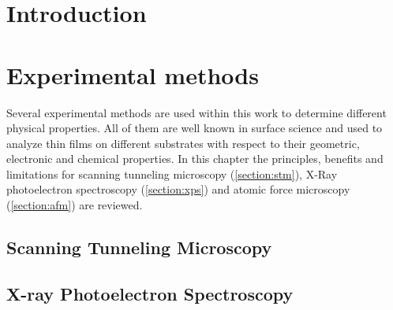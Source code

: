 \documentclass[
twoside,				%
BCOR=12mm,				%
headings=normal,		%
headsepline,			%
footsepline,			%
plainfootsepline,		%
]{scrbook}
\begin{document}

 \frontmatter{}			 														%
 \setcounter{tocdepth}{2}														%
	\tableofcontents{}														 	%
%
\mainmatter{}
\chapter{Introduction}


\chapter{Experimental methods}
Several experimental methods are used within this work to determine different physical properties. All of them are well known in surface science and used to analyze thin films on different substrates with respect to their geometric, electronic and chemical properties.
In this chapter the principles, benefits and limitations for scanning tunneling microscopy (\autoref{section:stm}), X-Ray photoelectron spectroscopy (\autoref{section:xps}) and atomic force microscopy (\autoref{section:afm}) are reviewed. 

  \section{\textbf{S}canning \textbf{T}unneling \textbf{M}icroscopy}
  \label{section:stm}
    
  \section{\textbf{X}-ray \textbf{P}hotoelectron \textbf{S}pectroscopy}
  \label{section:xps}
	
\end{document}
